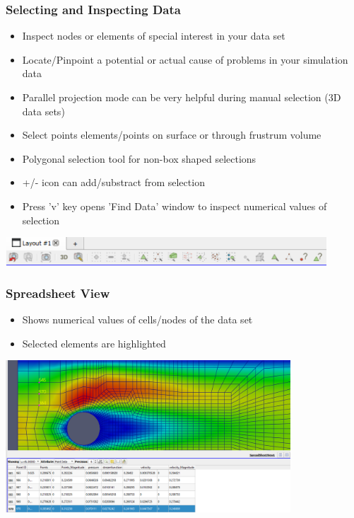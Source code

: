 \begin{frame}
  \frametitle{Selecting and Inspecting Data}
    \begin{itemize}
      \item Inspect nodes or elements of special interest in your data set
      \item Locate/Pinpoint a potential or actual cause of problems in your simulation data
      \item Parallel projection mode can be very helpful during manual selection (3D data sets)
      \item Select points elements/points on surface or through frustrum volume
      \item Polygonal selection tool for non-box shaped selections
      \item +/- icon can add/substract from selection
      \item Press 'v' key opens 'Find Data' window to inspect numerical values of selection
    \end{itemize}
		\begin{center}
      \includegraphics[width=0.9\textwidth]{screenshots/selection-icons.png}					
		\end{center}
\end{frame}

\begin{frame}
  \frametitle{Spreadsheet View}
    \begin{itemize}
      \item Shows numerical values of cells/nodes of the data set
      \item Selected elements are highlighted 
    \end{itemize}
		\begin{center}
      \includegraphics[width=0.8\textwidth]{screenshots/spreadsheet.png}					
		\end{center}
\end{frame}

